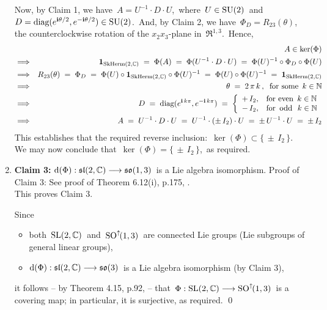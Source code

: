 \begin{enumerate}
	\vskip 0.3cm
	\noindent
	Now, by Claim 1, we have
	\,$A = U^{-1} \cdot D \cdot U$,\,
	where
	\,$U \in \textnormal{SU}(2)$\,
	and
	\,$D  = \textnormal{diag}(e^{\textnormal{\bf i}\theta/2},e^{-\textnormal{\bf i}\theta/2}) \in \textnormal{SU}(2)$.\,
	And, by Claim 2, we have
	\,$\Phi_{D} = R_{23}(\theta)$,\,
	the counterclockwise rotation of the
	$x_{2}x_{3}$-plane in \,$\Re^{1,3}$.\,
	Hence,
	\begin{eqnarray*}
	&&
		A \in \ker(\Phi)
	\\
	& \Longrightarrow &
		\mathbf{1}_{\textnormal{SkHerm}(2,\mathbb{C})}
		\; = \;
			\Phi(A)
		\; = \;
			\Phi(U^{-1} \cdot D \cdot U)
		\; = \;
			\Phi(U)^{-1} \circ \Phi_{D} \circ \Phi(U)
	\\
	& \Longrightarrow &
		R_{23}(\theta)
		\; = \;
			\Phi_{D}
		\; = \;
			\Phi(U) \circ \mathbf{1}_{\textnormal{SkHerm}(2,\mathbb{C})} \circ \Phi(U)^{-1}
		\; = \;
			\Phi(U) \circ \Phi(U)^{-1}
		\; = \;
			\mathbf{1}_{\textnormal{SkHerm}(2,\mathbb{C})}
	\\
	& \Longrightarrow &
		\theta
		\; = \;
			2\,\pi\,k\,,
		\;\;\textnormal{for some \,$k \in \mathbb{N}$}
	\\
	& \Longrightarrow &
		D
		\; = \;
			\textnormal{diag}(e^{\textnormal{\bf i}\,k\pi},e^{-\textnormal{\bf i}\,k\pi})
		\; = \;
			\left\{\begin{array}{cl}
				+\,I_{2}, & \textnormal{for even \,$k \in \mathbb{N}$}
				\\
				-\,I_{2}, & \textnormal{for \,odd\, \,$k \in \mathbb{N}$}
				\end{array}\right.
	\\
	& \Longrightarrow &
		A
		\; = \;
			U^{-1} \cdot D \cdot U
		\; = \;
			U^{-1} \cdot (\pm\,I_{2}) \cdot U
		\; = \;
			\pm \, U^{-1} \cdot U
		\; = \;
			\pm\,I_{2}
	\end{eqnarray*}
	This establishes that the required reverse inclusion: \,$\ker(\Phi) \subset \{\,\pm\,I_{2}\,\}$.\,
	We may now conclude that \,$\ker(\Phi) = \{\,\pm\,I_{2}\,\}$,\, as required.
\item
	\noindent
	\textbf{Claim 3:}\quad
	$\textnormal{d}(\Phi) : \mathfrak{sl}(2,\mathbb{C}) \longrightarrow \mathfrak{so}(1,3)$\,
	is a Lie algebra isomorphism.
	\vskip -0.01cm
	\noindent
	Proof of Claim 3:\;\;
	See proof of Theorem 6.12(i), p.175, \cite{Baker2002}.\\
	This proves Claim 3.

	\vskip 0.2cm
	\noindent
	Since
	\begin{itemize}
	\item
		both \,$\textnormal{SL}(2,\mathbb{C})$\, and \,$\textnormal{SO}^{\uparrow\!}(1,3)$\, are connected Lie groups (Lie subgroups of general linear groups),
	\item
		$\textnormal{d}(\Phi) : \mathfrak{sl}(2,\mathbb{C}) \longrightarrow \mathfrak{so}(3)$\,
		is a Lie algebra isomorphism (by Claim 3),
	\end{itemize}
	it follows -- by Theorem 4.15, p.92, \cite{Sepanski2010} -- that
	\,$\Phi : \textnormal{SL}(2,\mathbb{C}) \longrightarrow \textnormal{SO}^{\uparrow\!}(1,3)$\,
	is a covering map; in particular, it is surjective, as required.
	\qed
\end{enumerate}


\vskip 1.0cm


